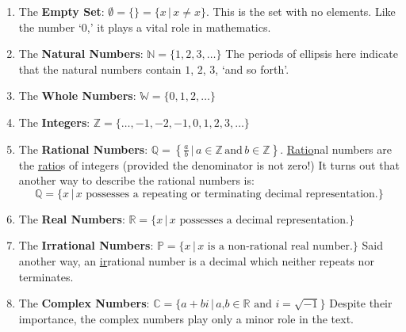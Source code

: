 \begin{formulabox}

\begin{enumerate}
	
	\item The \textbf{Empty Set}: $\emptyset=\{ \}=\{x\,|\,\mbox{$x
		\neq x$}\}$.  This is the set with no elements.  Like the number `$0$,' it  plays a vital role in mathematics.
	
	\item The \textbf{Natural Numbers}: $\mathbb N= \{ 1, 2, 3,  \ldots\}$ The periods of ellipsis here indicate that the natural numbers contain $1$, $2$, $3$, `and so forth'.
	
	\item The \textbf{Whole Numbers}: $\mathbb W = \{ 0, 1, 2, \ldots \}$
	
	\item The \textbf{Integers}: $\mathbb Z=\{ \ldots, -1, -2, -1, 0, 1, 2, 3, \ldots \}$
	
	\item The \textbf{Rational Numbers}: $\mathbb Q=\left\{\frac{a}{b} \, | \, a \in \mathbb Z \, \mbox{and} \, b \in \mathbb Z \right\}$.  \underline{Ratio}nal numbers are the \underline{ratio}s of integers (provided the denominator is not zero!)  It turns out that another way to describe the rational numbers is: \[\mathbb Q=\{x\,|\,\mbox{$x$ possesses a repeating or terminating decimal representation.}\}\]
	
	\item The \textbf{Real Numbers}: $\mathbb R = \{ x\,|\,\mbox{$x$ possesses a decimal representation.}\}$
	
	\item The \textbf{Irrational Numbers}: $\mathbb P = \{x\,|\,\mbox{$x$ is a non-rational real number.}\}$  Said another way, an \underline{ir}rational number is a decimal which neither repeats nor terminates.
	
	\item The \textbf{Complex Numbers}: $\mathbb C=\{a+bi\,|\,\mbox{$a$,$b \in \mathbb R$ and $i=\sqrt{-1}$}\}$  Despite their importance, the complex numbers play only a minor role in the text.
	
\end{enumerate}
\end{formulabox}

